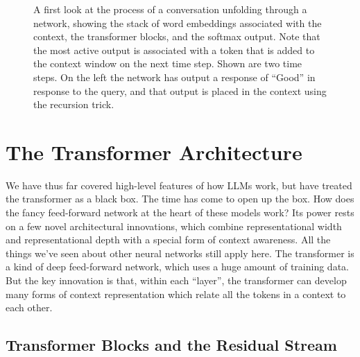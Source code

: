 \begin{figure}[ht]
\caption[Jeff Yoshimi]{A first look at the process of a conversation unfolding
through a network, showing the stack of word embeddings associated with the
context, the transformer blocks, and the softmax output. Note that the
most active output is associated with a token that is added to the context
window on the next time step. Shown are two time steps. On the left the network
has output a response of ``Good'' in response to the query, and that output is
placed in the context using the recursion trick.
}
\label{transformerOverview}
\end{figure}

\section{The Transformer Architecture}\label{transformers}


 
We have thus far covered high-level features of how LLMs work, but have treated
the transformer as a black box. The time has come to open up the box. How does
the fancy feed-forward network at the heart of these models work? Its power
rests on a few novel architectural innovations, which combine representational
width and representational depth with a special form of context awareness. All
the things we've seen about other neural networks still apply here. The
transformer is a kind of deep feed-forward network, which uses a huge amount of
training data. But the key innovation is that, within each ``layer'', the
transformer can develop many forms of context representation which relate all
the tokens in a context to each other.

\subsection{Transformer Blocks and the Residual Stream}

